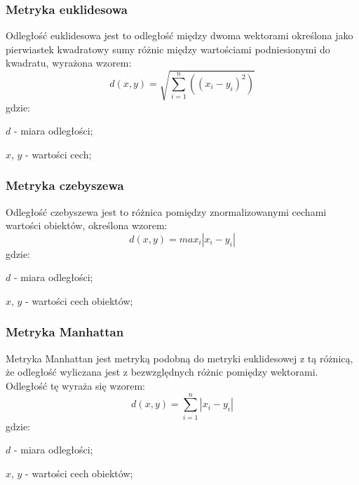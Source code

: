 \documentclass{classrep}
\begin{document}
\subsubsection{Metryka euklidesowa}
Odległość euklidesowa jest to odległość między dwoma wektorami określona jako pierwiastek kwadratowy sumy różnic między
wartościami podniesionymi do kwadratu, wyrażona wzorem:
\begin{equation}
    d(x,y)=\sqrt{\sum_{i=1}^{n}((x_{i}-y_{i})^{2})}
\end{equation}
gdzie:\\
\begin{description}
    \item $d$ - miara odległości;
    \item $x$, $y$ - wartości cech;
\end{description}

\subsubsection{Metryka czebyszewa}
Odległość czebyszewa jest to różnica pomiędzy znormalizowanymi cechami wartości obiektów, określona wzorem:
\begin{equation}
    d(x,y)=max_{i}|x_{i}-y_{i}|
\end{equation}
gdzie:\\
\begin{description}
    \item $d$ - miara odległości;
    \item $x$, $y$ - wartości cech obiektów;
\end{description}

\subsubsection{Metryka Manhattan}
Metryka Manhattan jest metryką podobną do metryki euklidesowej z tą różnicą, że odległość wyliczana jest
z bezwzględnych różnic pomiędzy wektorami. Odległość tę wyraża się wzorem:
\begin{equation}
    d(x,y)=\sum_{i=1}^{n} |x_{i}-y_{i}|
\end{equation}
gdzie:\\
\begin{description}
    \item $d$ - miara odległości;
    \item $x$, $y$ - wartości cech obiektów;
\end{description}
\end{document}

